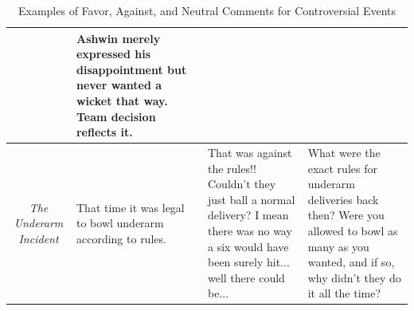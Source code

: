 \documentclass[sigconf, review]{acmart}
\begin{document}
\begin{table}[!htbp]
{\begin{tabular}{|c|p{4cm}|p{4cm}|p{4cm}|}
           & Ashwin merely expressed his disappointment but never wanted a wicket that way. Team decision reflects it. \\
          \hline
          {\textit{The Underarm Incident}} 
           & That time it was legal to bowl underarm according to rules. 
           & That was against the rules!! Couldn't they just ball a normal delivery? I mean there was no way a six would have been surely hit... well there could be... 
           & What were the exact rules for underarm deliveries back then? Were you allowed to bowl as many as you wanted, and if so, why didn't they do it all the time? \\
          \hline
      \end{tabular}
    } %
    \caption{Examples of Favor, Against, and Neutral Comments for Controversial Events}
    \label{tab:event_comments}
\end{table}



\end{document}
